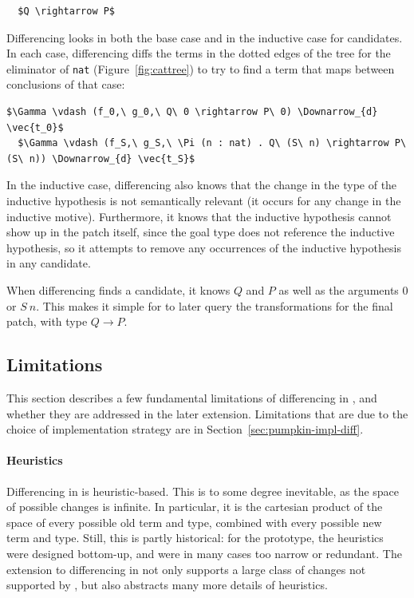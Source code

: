 \begin{lstlisting}
  $Q \rightarrow P$
\end{lstlisting}

Differencing looks in both the base case and in the inductive case for candidates.
In each case, differencing diffs the terms in the dotted edges of the tree for the eliminator of \lstinline{nat} (Figure~\ref{fig:cattree}) to
try to find a term that maps between conclusions of that case:

\begin{lstlisting}[language=coq]
  $\Gamma \vdash (f_0,\ g_0,\ Q\ 0 \rightarrow P\ 0) \Downarrow_{d} \vec{t_0}$
  $\Gamma \vdash (f_S,\ g_S,\ \Pi (n : nat) . Q\ (S\ n) \rightarrow P\ (S\ n)) \Downarrow_{d} \vec{t_S}$
\end{lstlisting}
In the inductive case, differencing also knows that the change in the type of the inductive hypothesis is not semantically relevant (it occurs for any change in the inductive motive).
Furthermore, it knows that the inductive hypothesis cannot show up in the patch itself, since the goal type does not reference the inductive hypothesis,
so it attempts to remove any occurrences of the inductive hypothesis in any candidate.

When differencing finds a candidate, it knows $Q$ and $P$ as well as the arguments $0$ or $S\ n$.
This makes it simple for \sysname to later query the transformations for the final patch, with type $Q \rightarrow P$.

\subsection{Limitations}
\label{sec:pumpkin-diff-limitations}


This section describes a few fundamental limitations of differencing in \sysname,
and whether they are addressed in the later \toolnamec extension.
Limitations that are due to the choice of implementation strategy are in Section~\ref{sec:pumpkin-impl-diff}.

\paragraph{Heuristics}
Differencing in \sysname is heuristic-based.
This is to some degree inevitable, as the space of possible changes is infinite.
In particular, it is the cartesian product of the space of every possible old term and type,
combined with every possible new term and type.
Still, this is partly historical: for the \sysname prototype, the heuristics were designed bottom-up, and were in many cases too narrow or redundant.
The extension to differencing in \toolnamec not only supports a large class of changes not supported by \sysname,
but also abstracts many more details of heuristics.

